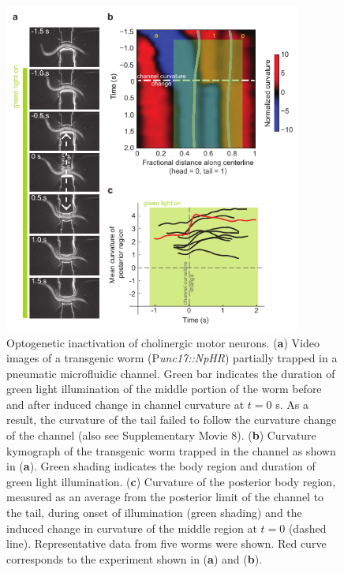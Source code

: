 \begin{figure} 
\includegraphics[width=0.87\textwidth]{figures/proc4}
\caption[ Optogenetic inactivation of cholinergic motor neurons.] { Optogenetic inactivation of cholinergic motor neurons.   
(\textbf{a}) Video images of a transgenic worm (P\textit{unc17::NpHR}) partially trapped in a pneumatic 
microfluidic channel. Green bar indicates the duration of green light illumination of the middle 
portion of the worm before and after induced change in channel curvature at $t = 0$ s. As a result, 
the curvature of the tail failed to follow the curvature change of the channel (also see 
Supplementary Movie 8). 
(\textbf{b}) Curvature kymograph of the transgenic worm trapped in the channel as shown in (\textbf{a}). Green 
shading indicates the body region and duration of green light illumination. 
(\textbf{c}) Curvature of the posterior body region, measured as an average from the posterior limit of the 
channel to the tail, during onset of illumination (green shading) and the induced change in 
curvature of the middle region at $t = 0$ (dashed line). Representative data from five worms were 
shown. Red curve corresponds to the experiment shown in (\textbf{a}) and (\textbf{b}). 
\label{fig:proc4}}
\end{figure}

